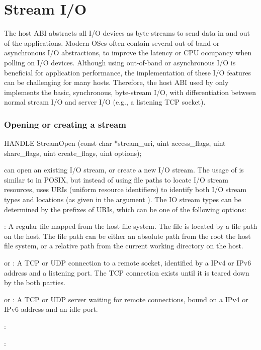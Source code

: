 \section{Stream I/O}
\label{sec:abi:streams}


The host ABI abstracts all I/O devices as byte streams to send data in and out of the applications.
Modern OSes often contain several out-of-band or asynchronous I/O abstractions, to improve the latency or CPU occupancy when polling on I/O devices.
Although using out-of-band or asynchronous I/O is beneficial for application performance, the implementation of these I/O features can be challenging for many hosts.
Therefore, the host ABI used by \graphene{} only implements the basic, synchronous, byte-stream I/O,
with differentiation between normal stream I/O and server I/O (e.g., a listening TCP socket).  

\subsubsection*{Opening or creating a stream}


\begin{paldef}
HANDLE StreamOpen (const char *stream_uri,
                   uint access_flags, uint share_flags,
                   uint create_flags, uint options);
\end{paldef}


 can open an existing I/O stream, or create a new I/O stream.
The usage of  is similar to  in POSIX,
but instead of using file paths to locate I/O stream resources,  uses URIs (uniform resource identifiers) to identify both I/O stream types and locations (as given in the argument ).
The IO stream types can be determined by the {\rm prefixes} of URIs, which can be one of the following options:

\begin{compactitem}
\item {}: A regular file mapped from the host file system. The file is located by a file path on the host. The file path can be either an absolute path from the root the host file system, or a relative path from the current working directory on the host.
\item {} or : A TCP or UDP connection to a remote socket, identified by a IPv4 or IPv6 address and a listening port. The TCP connection exists until it is teared down by the both parties.
\item {} or : A TCP or UDP server waiting for remote connections, bound on a IPv4 or IPv6 address and an idle port.
\item {}:
\item {}:
\end{compactitem}




